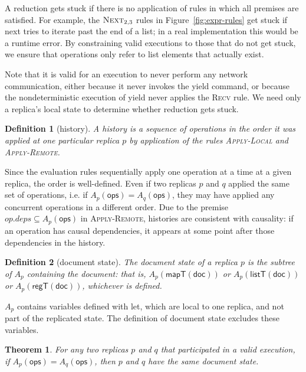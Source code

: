 \documentclass[10pt,journal,compsoc]{IEEEtran}
\newtheorem{definition}{Definition}
\newtheorem*{convergence-thm}{Theorem}
\begin{document}
A reduction gets stuck if there is no application of rules in which all premises are satisfied. For example, the $\textsc{Next}_{2,3}$ rules in Figure~\ref{fig:expr-rules} get stuck if \textsf{next} tries to iterate past the end of a list; in a real implementation this would be a runtime error. By constraining valid executions to those that do not get stuck, we ensure that operations only refer to list elements that actually exist.

Note that it is valid for an execution to never perform any network communication, either because it never invokes the \textsf{yield} command, or because the nondeterministic execution of \textsf{yield} never applies the \textsc{Recv} rule. We need only a replica's local state to determine whether reduction gets stuck.

\begin{definition}[history]\label{def:history}
A \emph{history} is a sequence of operations in the order it was applied at one particular replica $p$ by application of the rules \textsc{Apply-Local} and \textsc{Apply-Remote}.
\end{definition}

Since the evaluation rules sequentially apply one operation at a time at a given replica, the order is well-defined. Even if two replicas $p$ and $q$ applied the same set of operations, i.e. if $A_p(\mathsf{ops}) = A_q(\mathsf{ops})$, they may have applied any concurrent operations in a different order. Due to the premise $\mathit{op.deps} \subseteq A_p(\mathsf{ops})$ in \textsc{Apply-Remote}, histories are consistent with causality: if an operation has causal dependencies, it appears at some point after those dependencies in the history.

\begin{definition}[document state]\label{def:doc-state}
The \emph{document state} of a replica $p$ is the subtree of $A_p$ containing the document: that is, $A_p(\mathsf{mapT}(\mathsf{doc}))$ or $A_p(\mathsf{listT}(\mathsf{doc}))$ or $A_p(\mathsf{regT}(\mathsf{doc}))$, whichever is defined.
\end{definition}

$A_p$ contains variables defined with \textsf{let}, which are local to one replica, and not part of the replicated state. The definition of document state excludes these variables.

\begin{convergence-thm}
For any two replicas $p$ and $q$ that participated in a valid execution, if $A_p(\mathsf{ops}) = A_q(\mathsf{ops})$, then $p$ and $q$ have the same document state.
\end{convergence-thm}
\end{document}
